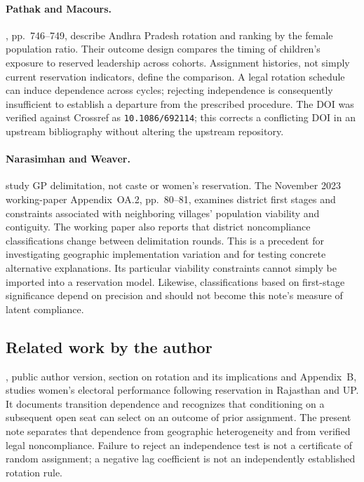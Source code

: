 \paragraph{Pathak and Macours.}
\citet{pathak2017}, pp.~746--749, describe Andhra Pradesh rotation and ranking
by the female population ratio. Their outcome design compares the timing of
children's exposure to reserved leadership across cohorts. Assignment histories,
not simply current reservation indicators, define the comparison. A legal
rotation schedule can induce dependence across cycles; rejecting independence
is consequently insufficient to establish a departure from the prescribed
procedure. The DOI was verified against Crossref as
\texttt{10.1086/692114}; this corrects a conflicting DOI in an upstream
bibliography without altering the upstream repository.

\paragraph{Narasimhan and Weaver.}
\citet{weaver2024} study GP delimitation, not caste or women's reservation.
The November 2023 working-paper Appendix~OA.2, pp.~80--81, examines district
first stages and constraints associated with neighboring villages' population
viability and contiguity. The working paper also reports that district
noncompliance classifications change between delimitation rounds. This is a
precedent for investigating geographic implementation variation and for testing
concrete alternative explanations. Its particular viability constraints cannot
simply be imported into a reservation model. Likewise, classifications based on
first-stage significance depend on precision and should not become this note's
measure of latent compliance.

\subsection{Related work by the author}

\citet{soodquota}, public author version, section on rotation and its
implications and Appendix~B, studies women's electoral performance following
reservation in Rajasthan and UP. It documents transition dependence and
recognizes that conditioning on a subsequent open seat can select on an outcome
of prior assignment. The present note separates that dependence from geographic
heterogeneity and from verified legal noncompliance. Failure to reject an
independence test is not a certificate of random assignment; a negative lag
coefficient is not an independently established rotation rule.

